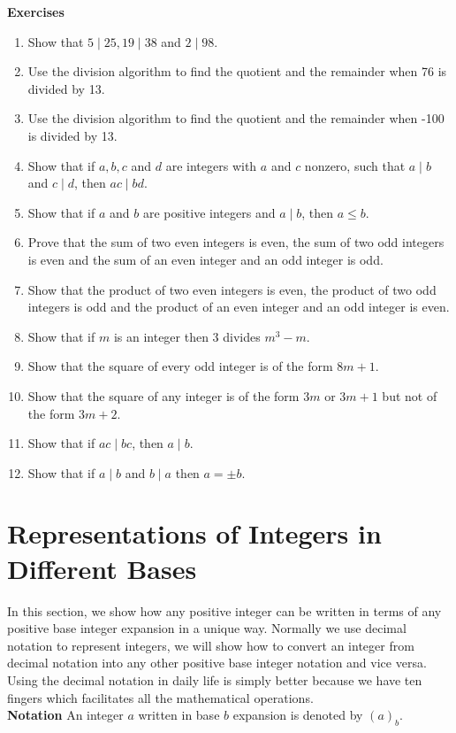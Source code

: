 \documentclass[12pt,letterpaper]{book}
\begin{document}
\textbf{Exercises}
\begin{enumerate}
\item{Show that $5\mid 25, 19\mid38$ and $2\mid 98$.}\item{Use the
division algorithm to find the quotient and the remainder when 76 is
divided by 13}. \item{Use the division algorithm to find the
quotient and the remainder when -100 is divided by 13.}\item{Show
that if $a,b,c$ and $d$ are integers with $a$ and $c$ nonzero, such
that $a\mid b$ and $c\mid d$, then $ac\mid bd$.}\item{Show that if
$a$ and $b$ are positive integers and $a\mid b$, then $a\leq
b$.}\item{Prove that the sum of two even integers is even, the sum
of two odd integers is even and the sum of an even integer and an
odd integer is odd.}\item{Show that the product of two even integers
is even, the product of two odd integers is odd and the product of
an even integer and an odd integer is even.} \item{Show that if $m$
is an integer then $3$ divides $m^3-m$.} \item{Show that the square
of every odd integer is of the form $8m+1$.}\item{Show that the
square of any integer is of the form $3m$ or $3m+1$ but not of the
form $3m+2$.}\item{Show that if $ac\mid bc$, then $a\mid
b$.}\item{Show that if $a\mid b$ and $b\mid a$ then $a=\pm b$.}
\end{enumerate}


\newpage


\section{Representations of Integers in Different Bases} \label{sec: base}
In this section, we show how any positive integer can be written in
terms of any positive base integer expansion in a unique way.
Normally we use decimal notation to represent integers, we will show
how to convert an integer from decimal notation into any other
positive base integer notation and vice versa.  Using the decimal
notation in daily life is simply better because we have ten fingers
which 
facilitates all the mathematical operations. \\
 \textbf{Notation} An integer $a$ written in
base $b$ expansion is denoted by $(a)_b$.
\end{document}
